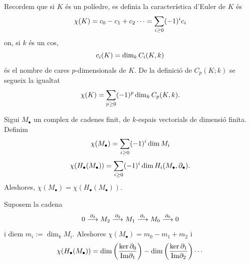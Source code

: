 \documentclass[../main.tex]{subfiles}
\begin{document}
Recordem que si $K$ és un políedre, es definia la característica d'Euler de $K$ és
\begin{equation}
    \notag
    \chi(K) = c_0-c_1+c_2\cdots = \sum_{i\geq 0} (-1)^{i}c_i
\end{equation}
on, si $k$ és un cos, 
\begin{equation}
    \notag
    c_i(K) = \dim_kC_i(K,k)
\end{equation}
és el nombre de cares $p$-dimensionals de $K$. De la definició de $C_p(K;k)$ se segueix la igualtat
\begin{equation}
    \notag
    \chi(K) = \sum_{p\geq 0}(-1)^p\dim_kC_p(K,k).
\end{equation}

\begin{ter}
Sigui $M_\bullet$ un complex de cadenes finit, de $k$-espais vectorials de dimensió finita. Definim
\begin{equation}
    \notag
    \chi(M_\bullet) = \sum_{i\geq 0}(-1)^{i}\dim M_i
\end{equation}
\begin{equation}
    \notag
    \chi(H_\bullet(M_\bullet)) = \sum_{i\geq0}(-1)^{i}\dim H_i(M_\bullet,\partial_\bullet).
\end{equation}
Aleshores, $\chi(M_\bullet) = \chi(H_\bullet(M_\bullet))$.
\end{ter}

\begin{ej}
Suposem la cadena
\begin{equation}
    \notag
    0\overset{\partial_3}{\longrightarrow} M_2\overset{\partial_2}{\longrightarrow} M_1\overset{\partial_1}{\longrightarrow} M_0\overset{\partial_0}{\longrightarrow} 0
\end{equation}
i diem $m_i:=\dim_kM_i$. Aleshores $\chi(M_\bullet) = m_0-m_1+m_2$ i 
\begin{equation}
    \notag
    \chi(H_\bullet(M_\bullet)) = \dim\left(\frac{\ker\partial_0}{\mathrm{Im}\partial_1}\right)-\dim\left(\frac{\ker\partial_1}{\mathrm{Im}\partial_2}\right)\cdots
\end{equation}
\end{ej}
\end{document}
